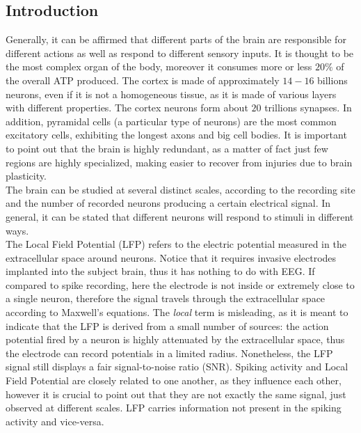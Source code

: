 \subsection{Introduction}
Generally, it can be affirmed that different parts of the brain are responsible
for different actions as well as respond to different sensory inputs. It is
thought to be the most complex organ of the body, moreover it consumes more or less
\(20\%\) of the overall ATP produced. The cortex is made of approximately \(14-16\)
billions neurons, even if it is not a homogeneous tissue, as it is made of various
layers with different properties. The cortex neurons form about \(20\) trillions
synapses. In addition, pyramidal cells (a particular type of neurons) are the
most common excitatory cells, exhibiting the longest axons and big cell bodies.
It is important to point out that the brain is highly redundant, as a matter of fact
just few regions are highly specialized, making easier to recover from injuries
due to brain plasticity.\\
The brain can be studied at several distinct scales, according to the recording site
and the number of recorded neurons producing a certain electrical signal. In general,
it can be stated that different neurons will respond to stimuli in different ways.\\
The Local Field Potential (LFP) refers to the electric potential measured in the
extracellular space around neurons. Notice that it requires invasive electrodes
implanted into the subject brain, thus it has nothing to do with EEG. If compared to
spike recording, here the electrode is not inside or extremely close to a single neuron,
therefore the signal travels through the extracellular space according to Maxwell's
equations. The \textit{local} term is misleading, as it is meant to indicate that
the LFP is derived from a small number of sources: the action potential fired by a
neuron is highly attenuated by the extracellular space, thus the electrode can record
potentials in a limited radius. Nonetheless, the LFP signal still displays a fair
signal-to-noise ratio (SNR). Spiking activity and Local Field Potential are closely
related to one another, as they influence each other, however it is crucial to point
out that they are not exactly the same signal, just observed at different scales.
LFP carries information not present in the spiking activity and vice-versa.
